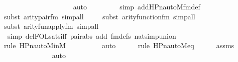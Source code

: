 \begin{isabellebody}
\ \ \ \ \ \ \ \ \ \ \ \ \ \ \ \ \ \ \isamarkupfalse%
\ auto{\isacharbrackleft}{\kern0pt}{}{}{\isacharbrackright}{\kern0pt}\isanewline
\ \ \ \ \ \ \ \ \isamarkupfalse%
{\isacharparenleft}{\kern0pt}simp\ add{\isacharcolon}{\kern0pt}HPn{\isacharunderscore}{\kern0pt}auto{\isacharunderscore}{\kern0pt}M{\isacharunderscore}{\kern0pt}fm{\isacharprime}{\kern0pt}{\isacharunderscore}{\kern0pt}def{\isacharparenright}{\kern0pt}{\isacharplus}{\kern0pt}\isanewline
\ \ \ \ \isamarkupfalse%
{\isacharparenleft}{\kern0pt}subst\ arity{\isacharunderscore}{\kern0pt}pair{\isacharunderscore}{\kern0pt}fm{\isacharcomma}{\kern0pt}\ simp{\isacharunderscore}{\kern0pt}all{\isacharparenright}{\kern0pt}{\isacharplus}{\kern0pt}\isanewline
\ \ \ \ \isamarkupfalse%
{\isacharparenleft}{\kern0pt}subst\ arity{\isacharunderscore}{\kern0pt}function{\isacharunderscore}{\kern0pt}fm{\isacharcomma}{\kern0pt}\ simp{\isacharunderscore}{\kern0pt}all{\isacharparenright}{\kern0pt}\isanewline
\ \ \ \ \isamarkupfalse%
{\isacharparenleft}{\kern0pt}subst\ arity{\isacharunderscore}{\kern0pt}fun{\isacharunderscore}{\kern0pt}apply{\isacharunderscore}{\kern0pt}fm{\isacharcomma}{\kern0pt}\ simp{\isacharunderscore}{\kern0pt}all{\isacharparenright}{\kern0pt}{\isacharplus}{\kern0pt}\isanewline
\ \ \ \ \ \ \ \isamarkupfalse%
\ {\isacharparenleft}{\kern0pt}simp\ del{\isacharcolon}{\kern0pt}FOL{\isacharunderscore}{\kern0pt}sats{\isacharunderscore}{\kern0pt}iff\ pair{\isacharunderscore}{\kern0pt}abs\ add{\isacharcolon}{\kern0pt}\ fm{\isacharunderscore}{\kern0pt}defs\ nat{\isacharunderscore}{\kern0pt}simp{\isacharunderscore}{\kern0pt}union{\isacharparenright}{\kern0pt}\ \isanewline
\ \ \ \ \ \ \isamarkupfalse%
{\isacharparenleft}{\kern0pt}rule\ HPn{\isacharunderscore}{\kern0pt}auto{\isacharunderscore}{\kern0pt}M{\isacharunderscore}{\kern0pt}in{\isacharunderscore}{\kern0pt}M{\isacharparenright}{\kern0pt}\isanewline
\ \ \ \ \ \ \ \ \isamarkupfalse%
\ auto{\isacharbrackleft}{\kern0pt}{}{\isacharbrackright}{\kern0pt}\isanewline
\ \ \ \ \ \isamarkupfalse%
{\isacharparenleft}{\kern0pt}rule\ HPn{\isacharunderscore}{\kern0pt}auto{\isacharunderscore}{\kern0pt}M{\isacharunderscore}{\kern0pt}eq{\isacharparenright}{\kern0pt}\isanewline
\ \ \ \ \isamarkupfalse%
\ assms\isanewline
\ \ \ \ \ \ \ \ \ \ \ \ \isamarkupfalse%
\ auto{\isacharbrackleft}{\kern0pt}{}{\isacharbrackright}{\kern0pt}\isanewline

\end{isabellebody}
